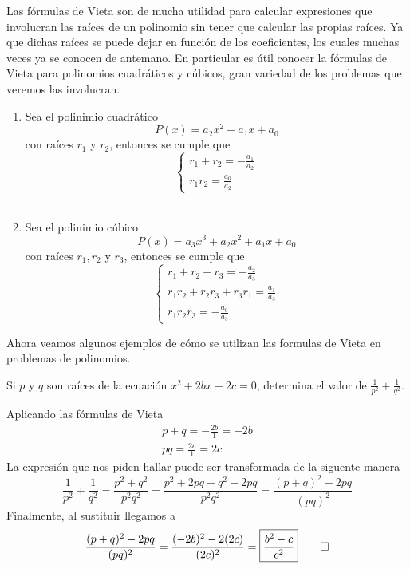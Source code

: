 Las fórmulas de Vieta son de mucha utilidad para calcular expresiones que involucran las raíces de un polinomio sin tener que calcular las propias raíces.
Ya que dichas raíces se puede dejar en función de los coeficientes, los cuales muchas veces ya se conocen de antemano.
En particular es útil conocer la fórmulas de Vieta para polinomios cuadráticos y cúbicos, gran variedad de los problemas que veremos las involucran.

\begin{multicols}{2}
    \begin{enumerate}
        \item Sea el polinimio cuadrático \[P(x) = a_2 x^2 + a_1 x + a_0\] con raíces $r_1$ y $r_2$, entonces se cumple que
        \[
            \begin{cases}
                r_1 + r_2 = - \frac{a_1}{a_2} \\
                r_1 r_2 = \frac{a_0}{a_2}
            \end{cases}
        \]
        \\
        \item Sea el polinimio cúbico \[P(x) = a_3 x^3 + a_2 x^2 + a_1 x + a_0\] con raíces $r_1, r_2$ y $r_3$, entonces se cumple que
        \[
            \begin{cases}
                r_1 + r_2 + r_3 = - \frac{a_2}{a_3}\\
                r_1 r_2 + r_2 r_3 + r_3 r_1 = \frac{a_1}{a_3}\\
                r_1 r_2 r_3 = - \frac{a_0}{a_3}
            \end{cases}
        \]
    \end{enumerate}
\end{multicols}

Ahora veamos algunos ejemplos de cómo se utilizan las formulas de Vieta en problemas de polinomios.

\begin{section-example.tcb}
    Si $p$ y $q$ son raíces de la ecuación $x^2 + 2bx + 2c = 0$, determina el valor de $\frac{1}{p^2} + \frac{1}{q^2}.$
\end{section-example.tcb}
\begin{solution}
    Aplicando las fórmulas de Vieta
    \begin{gather*}
        p + q = - \frac{2b}{1} = - 2b \\
        pq = \frac{2c}{1} = 2c
    \end{gather*}
    La expresión que nos piden hallar puede ser transformada de la siguente manera
    \[
        \frac{1}{p^2} + \frac{1}{q^2} = \frac{p^2 + q^2}{p^2 q^2} = \frac{p^2 + 2pq + q^2 - 2pq}{p^2 q^2} = \frac{ (p + q)^2 - 2pq}{(pq)^2}
    \]
    Finalmente, al sustituir llegamos a
    \[
        \frac{ (p + q)^2 - 2pq}{(pq)^2} = \frac{ (-2b)^2 - 2(2c)}{(2c)^2} = \boxed{\frac{b^2 - c}{c^2}} \qedhere
    \]
\end{solution}

